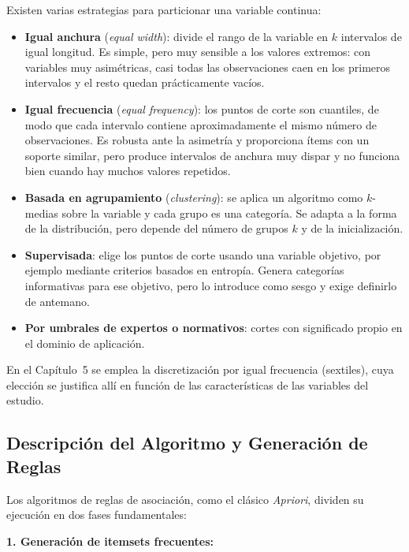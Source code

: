 \documentclass[twoside,a4paper,12pt,onecolumn,openany]{book}
\begin{document}
Existen varias estrategias para particionar una variable continua:
\begin{itemize}
    \item \textbf{Igual anchura} (\textit{equal width}): divide el rango de la variable en $k$ intervalos de igual longitud. Es simple, pero muy sensible a los valores extremos: con variables muy asimétricas, casi todas las observaciones caen en los primeros intervalos y el resto quedan prácticamente vacíos.
    
    \item \textbf{Igual frecuencia} (\textit{equal frequency}): los puntos de corte son cuantiles, de modo que cada intervalo contiene aproximadamente el mismo número de observaciones. Es robusta ante la asimetría y proporciona ítems con un soporte similar, pero produce intervalos de anchura muy dispar y no funciona bien cuando hay muchos valores repetidos.
    
    \item \textbf{Basada en agrupamiento} (\textit{clustering}): se aplica un algoritmo como $k$-medias sobre la variable y cada grupo es una categoría. Se adapta a la forma de la distribución, pero depende del número de grupos $k$ y de la inicialización.
    
    \item \textbf{Supervisada}: elige los puntos de corte usando una variable objetivo, por ejemplo mediante criterios basados en entropía. Genera categorías informativas para ese objetivo, pero lo introduce como sesgo y exige definirlo de antemano.
    
    \item \textbf{Por umbrales de expertos o normativos}: cortes con significado propio en el dominio de aplicación.
\end{itemize}
En el Capítulo~5 se emplea la discretización por igual frecuencia (sextiles), cuya elección se justifica allí en función de las características de las variables del estudio.
 

\subsection{Descripción del Algoritmo y Generación de Reglas}

Los algoritmos de reglas de asociación, como el clásico \textit{Apriori}, dividen su ejecución en dos fases fundamentales:

\vspace{0.5cm}

\textbf{1. Generación de itemsets frecuentes:} \\
\end{document}
